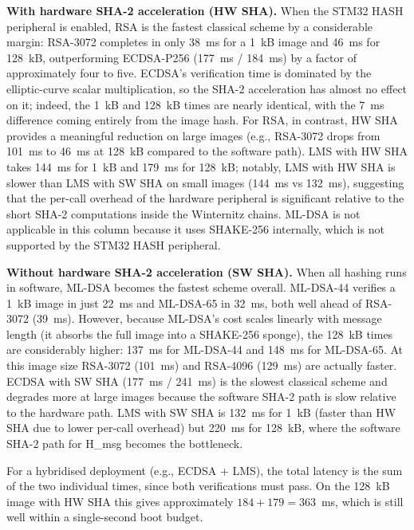 \textbf{With hardware SHA-2 acceleration (HW SHA).} When the STM32 HASH peripheral is enabled, RSA is the fastest classical scheme by a considerable margin: RSA-3072 completes in only 38~ms for a 1~kB image and 46~ms for 128~kB, outperforming ECDSA-P256 (177~ms / 184~ms) by a factor of approximately four to five. ECDSA's verification time is dominated by the elliptic-curve scalar multiplication, so the SHA-2 acceleration has almost no effect on it; indeed, the 1~kB and 128~kB times are nearly identical, with the 7~ms difference coming entirely from the image hash. For RSA, in contrast, HW SHA provides a meaningful reduction on large images (e.g., RSA-3072 drops from 101~ms to 46~ms at 128~kB compared to the software path). LMS with HW SHA takes 144~ms for 1~kB and 179~ms for 128~kB; notably, LMS with HW SHA is slower than LMS with SW SHA on small images (144~ms vs 132~ms), suggesting that the per-call overhead of the hardware peripheral is significant relative to the short SHA-2 computations inside the Winternitz chains. ML-DSA is not applicable in this column because it uses SHAKE-256 internally, which is not supported by the STM32 HASH peripheral.

\textbf{Without hardware SHA-2 acceleration (SW SHA).} When all hashing runs in software, ML-DSA becomes the fastest scheme overall. ML-DSA-44 verifies a 1~kB image in just 22~ms and ML-DSA-65 in 32~ms, both well ahead of RSA-3072 (39~ms). However, because ML-DSA's cost scales linearly with message length (it absorbs the full image into a SHAKE-256 sponge), the 128~kB times are considerably higher: 137~ms for ML-DSA-44 and 148~ms for ML-DSA-65. At this image size RSA-3072 (101~ms) and RSA-4096 (129~ms) are actually faster. ECDSA with SW SHA (177~ms / 241~ms) is the slowest classical scheme and degrades more at large images because the software SHA-2 path is slow relative to the hardware path. LMS with SW SHA is 132~ms for 1~kB (faster than HW SHA due to lower per-call overhead) but 220~ms for 128~kB, where the software SHA-2 path for H\_msg becomes the bottleneck.

For a hybridised deployment (e.g., ECDSA + LMS), the total latency is the sum of the two individual times, since both verifications must pass. On the 128~kB image with HW SHA this gives approximately $184 + 179 = 363$~ms, which is still well within a single-second boot budget.

